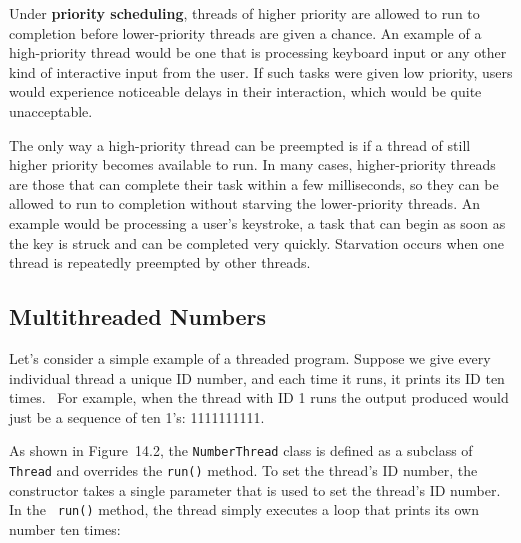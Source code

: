Under {\bf priority scheduling}, threads of higher priority are
allowed to run to completion before lower-priority threads are given a
chance.  An example of a high-priority thread would be one that
is processing keyboard input or any other kind of interactive input
from the user.  If such tasks were given low priority, users would
experience noticeable delays in their interaction, which would be
quite unacceptable.

The only way a high-priority thread can be preempted is if a thread of
still higher priority becomes available to run.  In many cases,
higher-priority threads are those that can complete their task within
a few milliseconds, so they can be allowed to run to completion
without starving the lower-priority threads. An example would be
processing a user's keystroke, a task that can begin as soon as the
key is struck and can be completed very quickly. Starvation occurs
when one thread is repeatedly preempted by other threads.


\subsection{Multithreaded Numbers}
\noindent Let's consider a simple example of a threaded program.  Suppose we give
every individual thread a unique ID number, and each time it runs, it
prints its ID ten times. ~For example, when the thread with ID 1
runs the output produced would just be a sequence of ten 1's: 1111111111.



As shown in Figure~14.2, the {\tt NumberThread} class is defined
as a subclass of {\tt Thread} and overrides the {\tt run()} method.
To set the thread's ID number, the constructor takes a single
parameter that is used to set the thread's ID number.  In the {\tt
run()} method, the thread simply executes a loop that prints its own
number ten times:

